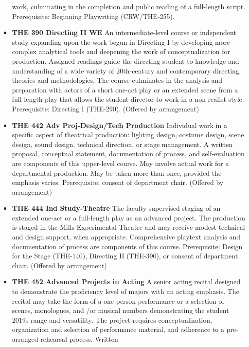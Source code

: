 \documentclass[
  letterpaper,
]{scrbook}
\begin{document}
\begin{itemize}
  work, culminating in the completion and public reading of a
  full-length script. Prerequisite: Beginning Playwriting
  (CRW/THE-255).\\
\item
  \textbf{THE 390 Directing II WE} An intermediate-level course or
  independent study expanding upon the work begun in Directing I by
  developing more complex analytical tools and deepening the work of
  conceptualization for production. Assigned readings guide the
  directing student to knowledge and understanding of a wide variety of
  20th-century and contemporary directing theories and methodologies.
  The course culminates in the analysis and preparation with actors of a
  short one-act play or an extended scene from a full-length play that
  allows the student director to work in a non-realist style.
  Prerequisite: Directing I (THE-290). (Offered by arrangement)
\item
  \textbf{THE 442 Adv Proj-Design/Tech Production} Individual work in a
  specific aspect of theatrical production: lighting design, costume
  design, scene design, sound design, technical direction, or stage
  management. A written proposal, conceptual statement, documentation of
  process, and self-evaluation are components of this upper-level
  course. May involve actual work for a departmental production. May be
  taken more than once, provided the emphasis varies. Prerequisite:
  consent of department chair. (Offered by arrangement)\\
\item
  \textbf{THE 444 Ind Study-Theatre} The faculty-supervised staging of
  an extended one-act or a full-length play as an advanced project. The
  production is staged in the Mills Experimental Theatre and may receive
  modest technical and design support, when appropriate. Comprehensive
  playtext analysis and documentation of process are components of this
  course. Prerequisite: Design for the Stage (THE-140), Directing II
  (THE-390), or consent of department chair. (Offered by arrangement)
\item
  \textbf{THE 452 Advanced Projects in Acting} A senior acting recital
  designed to demonstrate the proficiency level of majors with an acting
  emphasis. The recital may take the form of a one-person performance or
  a selection of scenes, monologues, and /or musical numbers
  demonstrating the student 2019s range and versatility. The project
  requires conceptualization, organization and selection of performance
  material, and adherence to a pre-arranged rehearsal process. Written

\end{itemize}
\end{document}
